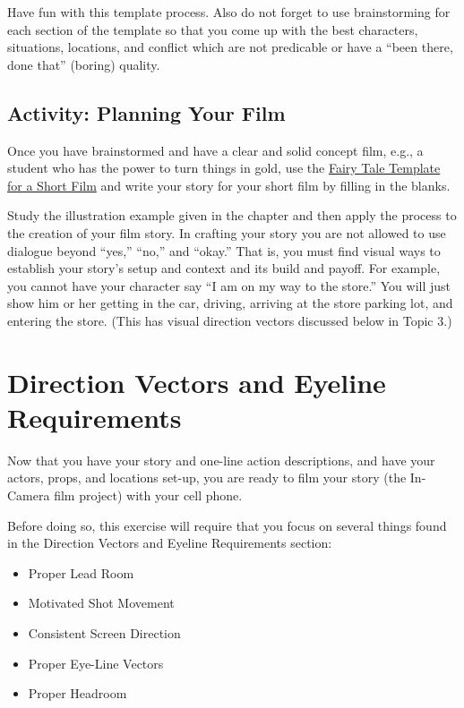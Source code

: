 \documentclass[
]{book}
\providecommand{\tightlist}{%
  \setlength{\itemsep}{0pt}\setlength{\parskip}{0pt}}
\begin{document}
Have fun with this template process. Also do not forget to use brainstorming for each section of the template so that you come up with the best characters, situations, locations, and conflict which are not predicable or have a ``been there, done that'' (boring) quality.

\hypertarget{activity-planning-your-film}{%
\subsection*{Activity: Planning Your Film}\label{activity-planning-your-film}}

\begin{reflect}
Once you have brainstormed and have a clear and solid concept film, e.g., a student who has the power to turn things in gold, use the \href{assets/unit6/Fairy_Tale_Template_for_a_Short_Film.pdf}{Fairy Tale Template for a Short Film} and write your story for your short film by filling in the blanks.

Study the illustration example given in the chapter and then apply the process to the creation of your film story. In crafting your story you are not allowed to use dialogue beyond ``yes,'' ``no,'' and ``okay.'' That is, you must find visual ways to establish your story's setup and context and its build and payoff. For example, you cannot have your character say ``I am on my way to the store.'' You will just show him or her getting in the car, driving, arriving at the store parking lot, and entering the store. (This has visual direction vectors discussed below in Topic 3.)
\end{reflect}

\hypertarget{direction-vectors-and-eyeline-requirements}{%
\section{Direction Vectors and Eyeline Requirements}\label{direction-vectors-and-eyeline-requirements}}

Now that you have your story and one-line action descriptions, and have your actors, props, and locations set-up, you are ready to film your story (the In-Camera film project) with your cell phone.

Before doing so, this exercise will require that you focus on several things found in the Direction Vectors and Eyeline Requirements section:

\begin{itemize}
\tightlist
\item
  Proper Lead Room\\
\item
  Motivated Shot Movement\\
\item
  Consistent Screen Direction\\
\item
  Proper Eye-Line Vectors\\
\item
  Proper Headroom
\end{itemize}
\end{document}
